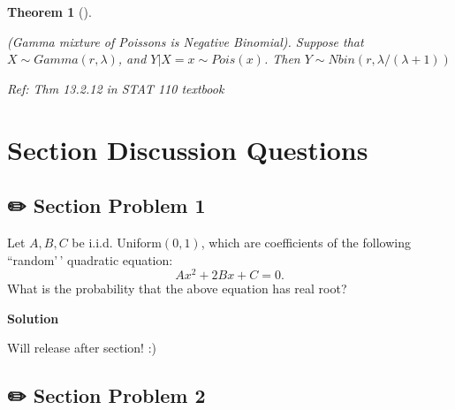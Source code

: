 \documentclass[
  letterpaper,
  DIV=11,
  numbers=noendperiod]{scrreprt}
\theoremstyle{definition}
\theoremstyle{plain}
\newtheorem{theorem}{Theorem}[chapter]
\theoremstyle{remark}
\begin{document}
\leavevmode{}%
\begin{theorem}[]\label{thm-mixture-poisson-negative-binomial}

(Gamma mixture of Poissons is Negative Binomial). Suppose that
\(X \sim Gamma(r, \lambda)\), and \(Y|X=x \sim Pois(x)\). Then
\(Y\sim Nbin(r, \lambda/(\lambda+1))\)

\emph{Ref: Thm 13.2.12 in STAT 110 textbook}

\end{theorem}

\hypertarget{section-discussion-questions}{%
\section*{Section Discussion
Questions}\label{section-discussion-questions}}


\hypertarget{section-problem-1-1}{%
\subsection*{✏️ Section Problem 1}\label{section-problem-1-1}}

Let \(A, B, C\) be i.i.d. Uniform\((0,1)\), which are coefficients of
the following ``random'\,' quadratic equation: \[
A x^2 + 2B x + C = 0.
\] What is the probability that the above equation has real root?

\begin{tcolorbox}[enhanced jigsaw, leftrule=.75mm, colframe=quarto-callout-tip-color-frame, colback=white, breakable, opacityback=0, left=2mm, bottomrule=.15mm, arc=.35mm, rightrule=.15mm, toprule=.15mm]
\begin{minipage}[t]{5.5mm}
\textcolor{quarto-callout-tip-color}{\faLightbulb}
\end{minipage}%
\begin{minipage}[t]{\textwidth - 5.5mm}

\textbf{Solution}\vspace{2mm}

Will release after section! :)

\end{minipage}%
\end{tcolorbox}

\hypertarget{section-problem-2-1}{%
\subsection*{✏️ Section Problem 2}\label{section-problem-2-1}}
\end{document}

